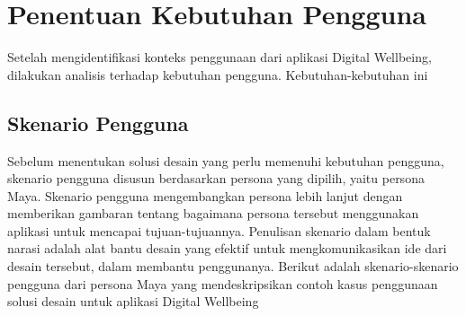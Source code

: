 \newcommand{\cccnormspacing}{\baselineskip=12pt}
\newcommand{\cccnormspacingcenter}{\centering\arraybackslash\cccnormspacing}


\section{Penentuan Kebutuhan Pengguna}

Setelah mengidentifikasi konteks penggunaan dari aplikasi Digital Wellbeing, dilakukan analisis terhadap kebutuhan pengguna. Kebutuhan-kebutuhan ini 

\subsection{Skenario Pengguna}
Sebelum menentukan solusi desain yang perlu memenuhi kebutuhan pengguna, skenario pengguna disusun berdasarkan persona yang dipilih, yaitu persona Maya. Skenario pengguna mengembangkan persona lebih lanjut dengan memberikan gambaran tentang bagaimana persona tersebut menggunakan aplikasi untuk mencapai tujuan-tujuannya. Penulisan skenario dalam bentuk narasi adalah alat bantu desain yang efektif untuk mengkomunikasikan ide dari desain tersebut, dalam membantu penggunanya. \parencite{cooper2014face} Berikut adalah skenario-skenario pengguna dari persona Maya yang mendeskripsikan contoh kasus penggunaan solusi desain untuk aplikasi Digital Wellbeing
